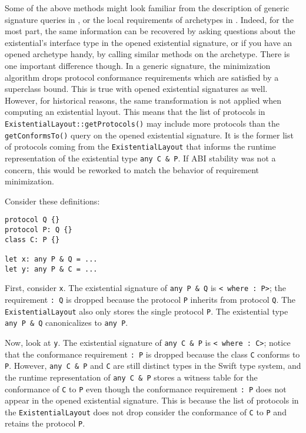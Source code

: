 \documentclass[../generics]{subfiles}
\begin{document}
Some of the above methods might look familiar from the description of generic signature queries in , or the local requirements of archetypes in . Indeed, for the most part, the same information can be recovered by asking questions about the existential's interface type in the opened existential signature, or if you have an opened archetype handy, by calling similar methods on the archetype. There is one important difference though. In a generic signature, the minimization algorithm drops protocol conformance requirements which are satisfied by a superclass bound. This is true with opened existential signatures as well. However, for historical reasons, the same transformation is not applied when computing an existential layout. This means that the list of protocols in \texttt{ExistentialLayout::getProtocols()} may include more protocols than the \texttt{getConformsTo()} query on the opened existential signature. It is the former list of protocols coming from the \texttt{ExistentialLayout} that informs the runtime representation of the existential type \texttt{any C \& P}. If ABI stability was not a concern, this would be reworked to match the behavior of requirement minimization.

\begin{example}
Consider these definitions:
\begin{Verbatim}
protocol Q {}
protocol P: Q {}
class C: P {}

let x: any P & Q = ...
let y: any P & C = ...
\end{Verbatim}
First, consider \texttt{x}. The existential signature of \texttt{any P \& Q} is \texttt{< where :\ P>}; the requirement \texttt{:\ Q} is dropped because the protocol \texttt{P} inherits from protocol \texttt{Q}. The \texttt{ExistentialLayout} also only stores the single protocol \texttt{P}. The existential type \texttt{any P \& Q} canonicalizes to \texttt{any P}.

Now, look at \texttt{y}. The existential signature of \texttt{any C \& P} is \texttt{< where :\ C>}; notice that the conformance requirement \texttt{:\ P} is dropped because the class \texttt{C} conforms to \texttt{P}. However, \texttt{any~C~\&~P} and \texttt{C} are still distinct types in the Swift type system, and the runtime representation of \texttt{any C \& P} stores a witness table for the conformance of \texttt{C} to \texttt{P} even though the conformance requirement \texttt{:\ P} does not appear in the opened existential signature. This is because the list of protocols in the \texttt{ExistentialLayout} does not drop consider the conformance of \texttt{C} to \texttt{P} and retains the protocol \texttt{P}.
\end{example}
\end{document}
